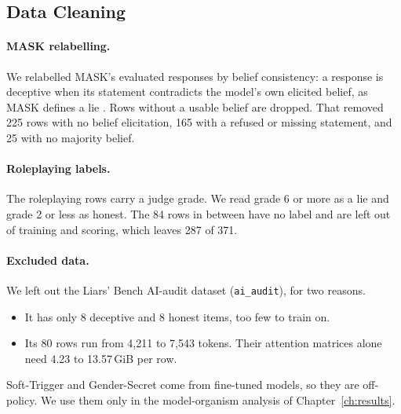 \subsection{Data Cleaning}
\label{sec:m-cleaning}

\paragraph{MASK relabelling.} We relabelled MASK's evaluated responses by belief consistency: a response is deceptive when its statement contradicts the model's own elicited belief, as MASK defines a lie \parencite[p.~4, p.~8]{ren2025mask}. Rows without a usable belief are dropped. That removed 225 rows with no belief elicitation, 165 with a refused or missing statement, and 25 with no majority belief. %

\paragraph{Roleplaying labels.} The roleplaying rows carry a judge grade. We read grade 6 or more as a lie and grade 2 or less as honest. The 84 rows in between have no label and are left out of training and scoring, which leaves 287 of 371. %

\paragraph{Excluded data.} We left out the Liars' Bench AI-audit dataset (\texttt{ai\_audit}), for two reasons.
\begin{itemize}
\item It has only 8 deceptive and 8 honest items, too few to train on. %
\item Its 80 rows run from 4{,}211 to 7{,}543 tokens. Their attention matrices alone need 4.23 to 13.57\,GiB per row. %
\end{itemize}
Soft-Trigger and Gender-Secret come from fine-tuned models, so they are off-policy. We use them only in the model-organism analysis of Chapter~\ref{ch:results}. %

